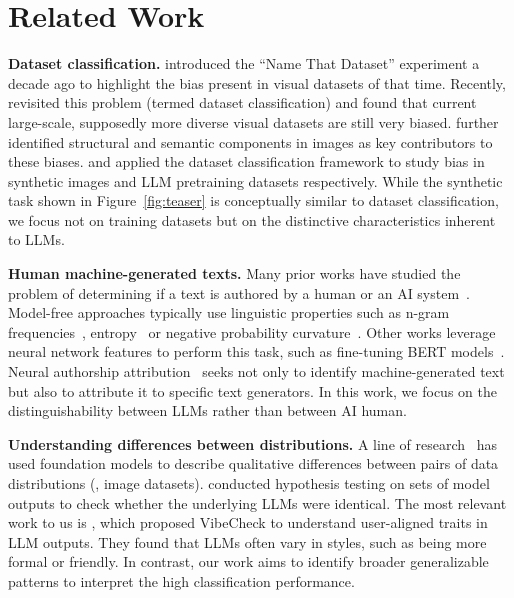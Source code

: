 \section{Related Work}
\textbf{Dataset classification.} \citet{torralba2011unbiased} introduced the ``Name That Dataset” experiment a decade ago to highlight the bias present in visual datasets of that time. Recently, \citet{liu2024datasetbias} revisited this problem (termed dataset classification) and found that current large-scale, supposedly more diverse visual datasets are still very biased. \citet{zeng2024bias} further identified structural and semantic components in images as key contributors to these biases. \citet{you2024images} and \citet{mansour2024bias} applied the dataset classification framework to study bias in synthetic images and LLM pretraining datasets respectively. 
While the synthetic task shown in  Figure~\ref{fig:teaser} is conceptually similar to dataset classification, we focus not on training datasets but on the distinctive characteristics inherent to LLMs.








\textbf{Human \vs machine-generated texts.} Many prior works have studied the problem of determining if a text is authored by a human or an AI system~\citep{mitchell2023detectgpt,mcgovern2024fingerprints}. Model-free approaches typically use linguistic properties such as n-gram frequencies~\citep{badaskar-etal-2008-identifying,openai_gpt2_dataset}, entropy~\citep{thomas2008entropy,gehrmann2019gltr} or negative probability curvature~\citep{mitchell2023detectgpt,bao2023fastdetectgpt}. Other works leverage neural network features to perform this task, such as fine-tuning BERT models~\citep{uchendu2021turingbench,ippolito2019automatic}. Neural authorship attribution~\citep{uchendu-etal-2020-authorship,huang2024authorship} seeks not only to identify machine-generated text but also to attribute it to specific text generators. In this work, we focus on the distinguishability between LLMs rather than between AI \vs human.

\textbf{Understanding differences between distributions.} A line of research~\citep{dunlap2023describing, zhong2024explaining} has used foundation models to describe qualitative differences between pairs of data distributions (\eg, image datasets). \citet{gao2024model} conducted hypothesis testing on sets of model outputs to check whether the underlying LLMs were identical. The most relevant work to us is \citet{dunlap2024vibecheck}, which proposed VibeCheck to understand user-aligned traits in LLM outputs. They found that LLMs often vary in styles, such as being more formal or friendly. In contrast, our work aims to identify broader generalizable patterns to interpret the high classification performance.